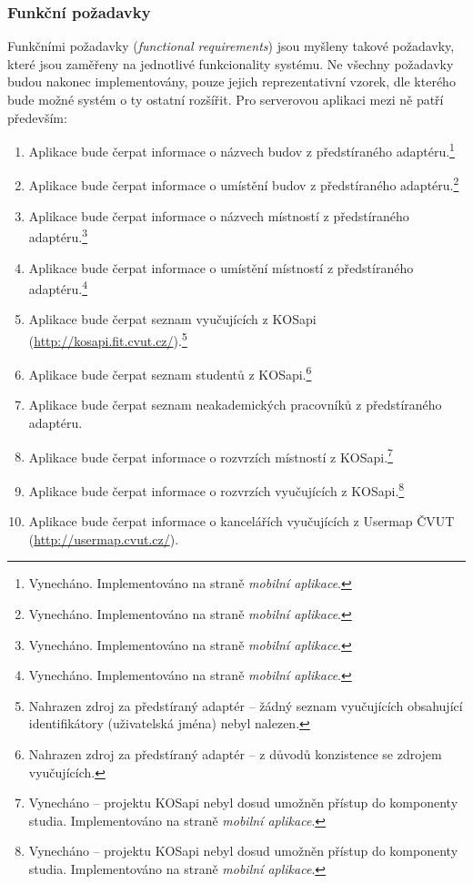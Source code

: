 \subsubsection{Funkční požadavky}
Funkčními požadavky (\textit{functional requirements}) jsou myšleny takové požadavky, které jsou zaměřeny na jednotlivé funkcionality systému. Ne všechny požadavky budou nakonec implementovány, pouze jejich reprezentativní vzorek, dle kterého bude možné systém o ty ostatní rozšířit. Pro serverovou aplikaci mezi ně patří především:
\begin{enumerate}
 \item Aplikace bude čerpat informace o názvech budov z předstíraného adaptéru.\footnote{Vynecháno. Implementováno na straně \textit{mobilní aplikace}.}
 \item Aplikace bude čerpat informace o umístění budov z předstíraného adaptéru.\footnote{Vynecháno. Implementováno na straně \textit{mobilní aplikace}.}
 \item Aplikace bude čerpat informace o názvech místností z předstíraného adaptéru.\footnote{Vynecháno. Implementováno na straně \textit{mobilní aplikace}.}
 \item Aplikace bude čerpat informace o umístění místností z předstíraného adaptéru.\footnote{Vynecháno. Implementováno na straně \textit{mobilní aplikace}.}
 \item Aplikace bude čerpat seznam vyučujících z KOSapi (\url{http://kosapi.fit.cvut.cz/}).\footnote{Nahrazen zdroj za předstíraný adaptér -- žádný seznam vyučujících obsahující identifikátory (uživatelská jména) nebyl nalezen.}
 \item Aplikace bude čerpat seznam studentů z KOSapi.\footnote{Nahrazen zdroj za předstíraný adaptér -- z důvodů konzistence se zdrojem vyučujících.}
 \item Aplikace bude čerpat seznam neakademických pracovníků z předstíraného adaptéru.
 \item Aplikace bude čerpat informace o rozvrzích místností z KOSapi.\footnote{Vynecháno -- projektu KOSapi nebyl dosud umožněn přístup do komponenty studia. Implementováno na straně \textit{mobilní aplikace}.}
 \item Aplikace bude čerpat informace o rozvrzích vyučujících z KOSapi.\footnote{Vynecháno -- projektu KOSapi nebyl dosud umožněn přístup do komponenty studia. Implementováno na straně \textit{mobilní aplikace}.}
 \item Aplikace bude čerpat informace o kancelářích vyučujících z Usermap ČVUT (\url{http://usermap.cvut.cz/}).

\end{enumerate}
